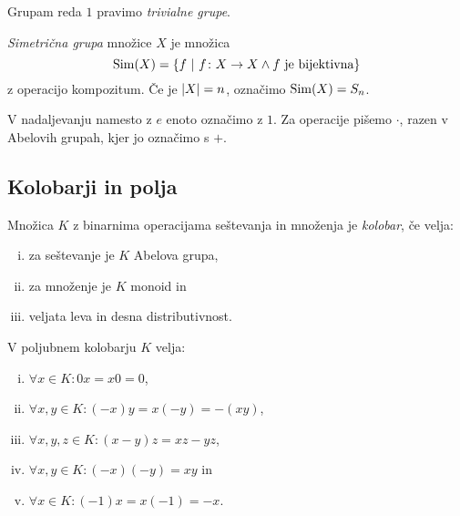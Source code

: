 \begin{definicija}
Grupam reda $1$ pravimo \emph{trivialne grupe}.
\end{definicija}

\begin{definicija}
\emph{Simetrična grupa} množice $X$ je množica
\[
\operatorname{Sim}(X)=\left\{f~\middle\vert~f\colon X\to X\land\text{$f$ je bijektivna}\right\}
\]
z operacijo kompozitum. Če je $\left\lvert X\right\rvert=n$, označimo $\operatorname{Sim}(X)=S_n$.
\end{definicija}

\begin{opomba}
V nadaljevanju namesto z $e$ enoto označimo z $1$. Za operacije pišemo $\cdot$, razen v Abelovih grupah, kjer jo označimo s $+$.
\end{opomba}

\newpage

\subsection{Kolobarji in polja}


\begin{definicija}
Množica $K$ z binarnima operacijama seštevanja in množenja je \emph{kolobar}, če velja:

\begin{enumerate}[i)]
\item za seštevanje je $K$ Abelova grupa,
\item za množenje je $K$ monoid in
\item veljata leva in desna distributivnost.
\end{enumerate}
\end{definicija}

\begin{trditev}
V poljubnem kolobarju $K$ velja:

\begin{enumerate}[i)]
\item $\forall x \in K \colon 0x = x0 = 0$,
\item $\forall x, y \in K \colon (-x)y = x(-y) = -(xy)$,
\item $\forall x, y, z \in K \colon (x-y)z = xz - yz$,
\item $\forall x, y \in K \colon (-x)(-y) = xy$ in
\item $\forall x \in K \colon (-1)x = x(-1) = -x$.
\end{enumerate}
\end{trditev}

